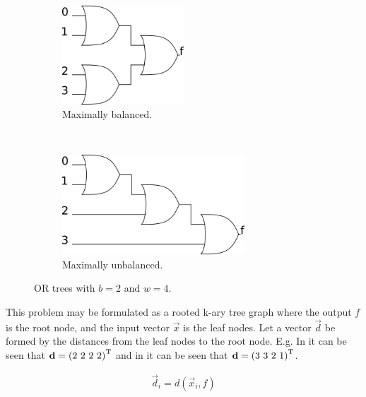 \documentclass[11pt,twoside]{article}
\begin{document}
\begin{figure}[h]
    \begin{subfigure}[t]{0.5\textwidth}
        \centering
        \includegraphics[width=0.5\textwidth]{OR_b2_w4_maxbal.png}
        \caption{Maximally balanced.
                 \label{fig:OR_b2_w4_maxbal}}
    \end{subfigure}%
    ~
    \begin{subfigure}[t]{0.5\textwidth}
        \centering
        \includegraphics[width=0.75\textwidth]{OR_b2_w4_unbal.png}
        \caption{Maximally unbalanced.
                 \label{fig:OR_b2_w4_unbal}}
    \end{subfigure}

    \caption{OR trees with $b=2$ and $w=4$. \label{fig:OR_b2_w4}}
\end{figure}

This problem may be formulated as a rooted k-ary tree graph where the output $f$
is the root node, and the input vector $\vec{x}$ is the leaf nodes.
Let a vector $\vec{d}$ be formed by the distances from the leaf nodes to the
root node.
E.g. In  it can be seen that
$\vec{d} = \transpose{(2\ 2\ 2\ 2)}$ and in  it can
be seen that $\mathbf{d} = {(3\ 3\ 2\ 1)}^\mathrm{T}$.

\begin{align} \label{eq:d}
\vec{d}_i = d(\vec{x}_i, f)
\end{align}
\end{document}

